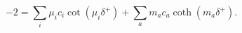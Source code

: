 \begin{equation}
\label{delta++} 
- 2 =
\sum_i \mu_i c_i \cot(\mu_i  \delta^+) + 
\sum_a m_a c_a \coth(m_a  \delta^+).
\end{equation}

